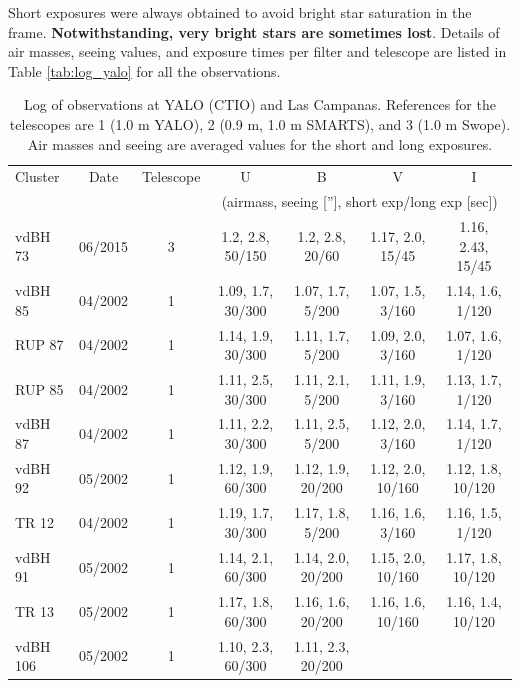 \documentclass[draft]{aa}
\begin{document}
Short exposures were always obtained to avoid bright star saturation in the
frame.\textbf{ Notwithstanding, very bright stars are sometimes lost}.
Details of air masses, seeing values, and exposure times per filter and
telescope are listed in Table \ref{tab:log_yalo} for all the observations.


\begin{table}[ht]
    \centering
    \caption{Log of observations at YALO (CTIO) and Las Campanas.
    References for the telescopes are 1 (1.0 m YALO), 2 (0.9 m, 1.0 m SMARTS), and
    3 (1.0 m Swope). Air masses and seeing are averaged values for the short and
    long exposures.}
    \begin{tabular}{lcccccc}
    \hline \hline 
        Cluster & Date & Telescope & U & B & V &  I\\
                &      &           &
        \multicolumn{4}{c}{(airmass, seeing [''], short exp/long exp [sec])}\\
       \hline
        vdBH 73   & 06/2015 & 3 & 1.2, 2.8, 50/150 & 1.2, 2.8, 20/60 &
        1.17, 2.0, 15/45  & 1.16, 2.43, 15/45\\
        vdBH 85   & 04/2002 & 1 & 1.09, 1.7, 30/300 & 1.07, 1.7, 5/200 &
        1.07, 1.5, 3/160 & 1.14, 1.6, 1/120\\
        RUP 87    & 04/2002 & 1 & 1.14, 1.9, 30/300 & 1.11, 1.7, 5/200 &
        1.09, 2.0, 3/160 & 1.07, 1.6, 1/120\\
        RUP 85    & 04/2002 & 1 & 1.11, 2.5, 30/300 & 1.11, 2.1, 5/200 &
        1.11, 1.9, 3/160 & 1.13, 1.7, 1/120\\
        vdBH 87   & 04/2002 & 1 & 1.11, 2.2, 30/300 & 1.11, 2.5, 5/200 &
        1.12, 2.0, 3/160 & 1.14, 1.7, 1/120\\
        vdBH 92   & 05/2002 & 1 & 1.12, 1.9, 60/300 & 1.12, 1.9, 20/200 &
        1.12, 2.0, 10/160 & 1.12, 1.8, 10/120\\
        TR 12     & 04/2002 & 1 & 1.19, 1.7, 30/300 & 1.17, 1.8, 5/200 &
        1.16, 1.6, 3/160 & 1.16, 1.5, 1/120\\
        vdBH 91   & 05/2002 & 1 & 1.14, 2.1, 60/300 & 1.14, 2.0, 20/200 &
        1.15, 2.0, 10/160 & 1.17, 1.8, 10/120\\
        TR 13     & 05/2002 & 1 & 1.17, 1.8, 60/300 & 1.16, 1.6, 20/200 &
        1.16, 1.6, 10/160 & 1.16, 1.4, 10/120\\
        vdBH 106  & 05/2002 & 1 & 1.10, 2.3, 60/300 & 1.11, 2.3, 20/200 &

\end{tabular}
\end{table}
\end{document}

